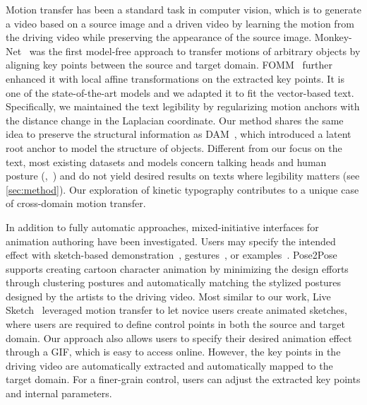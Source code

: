 Motion transfer has been a standard task in computer vision, which is to generate a video based on a source image and a driven video by learning the motion from the driving video while preserving the appearance of the source image.
Monkey-Net~\cite{siarohin2019animating} was the first model-free approach to transfer motions of arbitrary objects by aligning key points between the source and target domain.
FOMM~\cite{siarohin2019first} further enhanced it with local affine transformations on the extracted key points.
It is one of the state-of-the-art models and we adapted it to fit the vector-based text.
Specifically, we maintained the text legibility by regularizing motion anchors with the distance change in the Laplacian coordinate.
Our method shares the same idea to preserve the structural information as DAM~\cite{tao2022structure}, which introduced a latent root anchor to model the structure of objects.
Different from our focus on the text, most existing datasets and models concern talking heads and human posture (\eg,~\cite{chan2019everybody, zhou2020makeittalk, siarohin2021motion, hong2022depth, smith2023tog}) and do not yield desired results on texts where legibility matters (see \autoref{sec:method}).
Our exploration of kinetic typography contributes to a unique case of cross-domain motion transfer.


In addition to fully automatic approaches, mixed-initiative interfaces for animation authoring have been investigated.
Users may specify the intended effect with sketch-based demonstration~\cite{kazi2014draco, xing2016energy, kazi2016motionamplifiers, willett2018mixed}, gestures~\cite{arora2019magicalhands}, or examples~\cite{dvoroznak2017example}.
Pose2Pose~\cite{willett2020pose2pose} supports creating cartoon character animation by minimizing the design efforts through clustering postures and automatically matching the stylized postures designed by the artists to the driving video. 
Most similar to our work, Live Sketch~\cite{su2018live} leveraged motion transfer to let novice users create animated sketches, where users are required to define control points in both the source and target domain. 
Our approach also allows users to specify their desired animation effect through a GIF, which is easy to access online.
However, the key points in the driving video are automatically extracted and automatically mapped to the target domain.
For a finer-grain control, users can  adjust the extracted key points and internal parameters.


